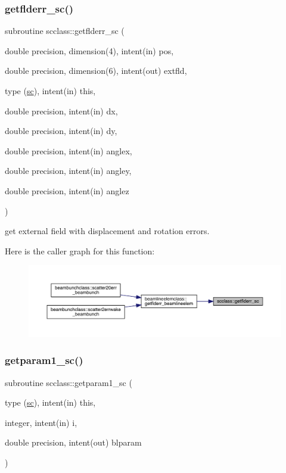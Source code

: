 \subsubsection{\texorpdfstring{getflderr\_sc()}{getflderr\_sc()}}
{\footnotesize\ttfamily subroutine scclass\+::getflderr\+\_\+sc (\begin{DoxyParamCaption}\item[{double precision, dimension(4), intent(in)}]{pos,  }\item[{double precision, dimension(6), intent(out)}]{extfld,  }\item[{type (\mbox{\hyperlink{namespacescclass_structscclass_1_1sc}{sc}}), intent(in)}]{this,  }\item[{double precision, intent(in)}]{dx,  }\item[{double precision, intent(in)}]{dy,  }\item[{double precision, intent(in)}]{anglex,  }\item[{double precision, intent(in)}]{angley,  }\item[{double precision, intent(in)}]{anglez }\end{DoxyParamCaption})}



get external field with displacement and rotation errors. 

Here is the caller graph for this function\+:\nopagebreak
\begin{figure}[H]
\begin{center}
\leavevmode
\includegraphics[width=350pt]{namespacescclass_abe42c84df8190cc0443752dff296dd89_icgraph}
\end{center}
\end{figure}
\mbox{\label{namespacescclass_a5f02207aa4bb28b292bf39bd5876c7e2}} 
\subsubsection{\texorpdfstring{getparam1\_sc()}{getparam1\_sc()}}
{\footnotesize\ttfamily subroutine scclass\+::getparam1\+\_\+sc (\begin{DoxyParamCaption}\item[{type (\mbox{\hyperlink{namespacescclass_structscclass_1_1sc}{sc}}), intent(in)}]{this,  }\item[{integer, intent(in)}]{i,  }\item[{double precision, intent(out)}]{blparam }\end{DoxyParamCaption})}


